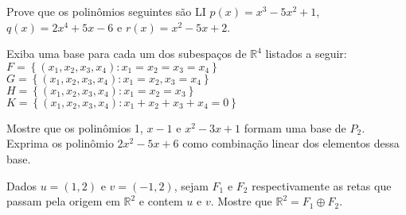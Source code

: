 \begin{ex}
Prove que os polinômios seguintes são LI $p(x)=x^{3}-5x^{2}+1$, $q(x)=2x^{4}+5x-6$ e $r(x)=x^{2}-5x+2$.
\end{ex}

\begin{ex}
	Exiba uma base para cada um dos subespaços de $\mathbb{R}^{4}$ listados a seguir:\\
	
	$F=\left\lbrace(x_{1},x_{2},x_{3},x_{4}): x_{1}=x_{2}=x_{3}=x_{4} \right\rbrace $\\
	$G=\left\lbrace(x_{1},x_{2},x_{3},x_{4}): x_{1}=x_{2}, x_{3}=x_{4} \right\rbrace $\\
	$H=\left\lbrace(x_{1},x_{2},x_{3},x_{4}): x_{1}=x_{2}=x_{3} \right\rbrace $\\
	$K=\left\lbrace(x_{1},x_{2},x_{3},x_{4}): x_{1}+x_{2}+x_{3}+x_{4}=0 \right\rbrace $\\
	
\end{ex}
\begin{ex}
	Mostre que os polinômios 1, $x-1$ e $x^{2}-3x+1$ formam uma base de $P_{2}$. Exprima os polinômio $2x^{2}-5x+6$ como combinação linear dos elementos dessa base.
\end{ex}
\begin{ex}
	Dados $u=(1,2)$ e $v=(-1,2)$, sejam $F_{1}$ e $F_{2}$ respectivamente as retas que passam pela origem em $\mathbb{R}^{2}$ e contem  $u$ e $v$. Mostre que $\mathbb{R}^{2}=F_{1}\oplus F_{2}$.
\end{ex}


